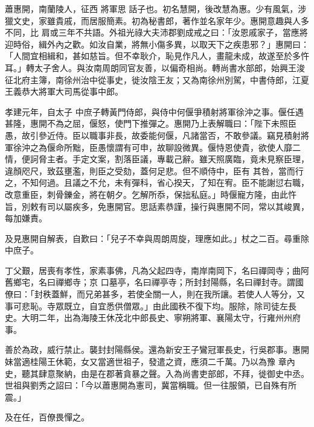 
\begin{pinyinscope}

 蕭惠開，南蘭陵人，征西
 將軍思
 話子也。初名慧開，後改慧為惠。少有風氣，涉獵文史，家雖貴戚，而居服簡素。初為秘書郎，著作並名家年少。惠開意趣與人多不同，比
 肩或三年不共語。外祖光祿大夫沛郡劉成戒之曰：「汝恩戚家子，當應將迎時俗，緝外內之歡。如汝自業，將無小傷多異，以取天下之疾患邪？」惠開曰：「人間宜相緝和，甚如慈旨。但不幸耿介，恥見作凡人，畫龍未成，故遂至於多忤耳。」轉太子舍人。與汝南周朗同官友善，以偏奇相尚。轉尚書水部郎，始興王浚征北府主簿，南徐州治中從事史，徙汝陰王友；又為南徐州別駕，中書侍郎，江夏王義恭大將軍大司馬從事中郎。



 孝建元年，自太子
 中庶子轉黃門侍郎，與侍中何偃爭積射將軍徐沖之事。偃任遇甚隆，惠開不為之屈，偃怒，使門下推彈之。惠開乃上表解職曰：「陛下未照臣愚，故引參近侍。臣以職事非長，故委能何偃，凡諸當否，不敢參議。竊見積射將軍徐沖之為偃命所黜，臣愚懷謂有可申，故聊設微異。偃恃恩使貴，欲使人靡二情，便訶脅主者。手定文案，割落臣議，專載己辭。雖天照廣臨，竟未見察臣理，違顏咫尺，致茲壅濫，則臣之受劾，蓋何足悲。但不順侍中，臣有
 其咎，當而行之，不知何過。且議之不允，未有彈科，省心揆天，了知在宥。臣不能謝愆右職，改意重臣，刺骨鑠金，將在朝夕。乞解所忝，保拙私庭。」時偃寵方隆，由此忤旨，別敕有司以屬疾多，免惠開官。思話素恭謹，操行與惠開不同，常以其峻異，每加嫌責。



 及見惠開自解表，自歎曰：「兒子不幸與周朗周旋，理應如此。」杖之二百。尋重除中庶子。



 丁父艱，居喪有孝性，家素事佛，凡為父起四寺，南岸南岡下，名曰禪岡寺；曲阿舊鄉宅，名曰禪鄉寺；京
 口墓亭，名曰禪亭寺；所封封陽縣，名曰禪封寺。謂國僚曰：「封秩蓋鮮，而兄弟甚多，若使全關一人，則在我所讓。若使人人等分，又事可悲恥。寺眾既立，自宜悉供僧眾。」由此國秩不復下均。服除，除司徒左長史。大明二年，出為海陵王休茂北中郎長史、寧朔將軍、襄陽太守，行雍州州府事。



 善於為政，威行禁止。襲封封陽縣侯。還為新安王子鸞冠軍長史，行吳郡事。惠開妹當適桂陽王休範，女又當適世祖子，發遣之資，應須二千萬。乃以為豫
 章內史，聽其肆意聚納，由是在郡著貪暴之聲。入為尚書吏部郎，不拜，徙御史中丞。世祖與劉秀之詔曰：「今以蕭惠開為憲司，冀當稱職。但一往服領，已自殊有所震。」



 及在任，百僚畏憚之。




\end{pinyinscope}
